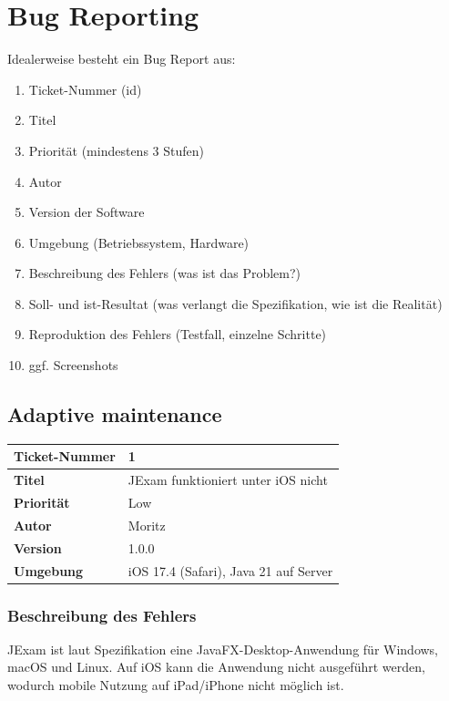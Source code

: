 \documentclass[a4paper]{article}
\title{\docTitle}
\author{Moritz}
\date{\today}
\begin{document}
\maketitle
\tableofcontents

\section{Bug Reporting}

Idealerweise besteht ein Bug Report aus:

\begin{enumerate}
    \item Ticket-Nummer (id)
    \item Titel
    \item Priorität (mindestens 3 Stufen)
    \item Autor
    \item Version der Software
    \item Umgebung (Betriebssystem, Hardware)
    \item Beschreibung des Fehlers (was ist das Problem?)
    \item Soll- und ist-Resultat (was verlangt die Spezifikation, wie ist die Realität)
    \item Reproduktion des Fehlers (Testfall, einzelne Schritte)
    \item ggf. Screenshots
\end{enumerate}

\newpage
\subsection{Adaptive maintenance}

\begin{center}
\begin{tabular}{|p{3cm}|p{8cm}|}
\hline
\textbf{Ticket-Nummer} & 1 \\
\hline
\textbf{Titel} & JExam funktioniert unter iOS nicht \\
\hline
\textbf{Priorität} & Low \\
\hline
\textbf{Autor} & Moritz \\
\hline
\textbf{Version} & 1.0.0 \\
\hline
\textbf{Umgebung} & iOS 17.4 (Safari), Java 21 auf Server \\
\hline
\end{tabular}
\end{center}

\subsubsection*{Beschreibung des Fehlers}
JExam ist laut Spezifikation eine JavaFX-Desktop-Anwendung für Windows, macOS und Linux. Auf iOS kann die Anwendung nicht ausgeführt werden, wodurch mobile Nutzung auf iPad/iPhone nicht möglich ist.
\end{document}
